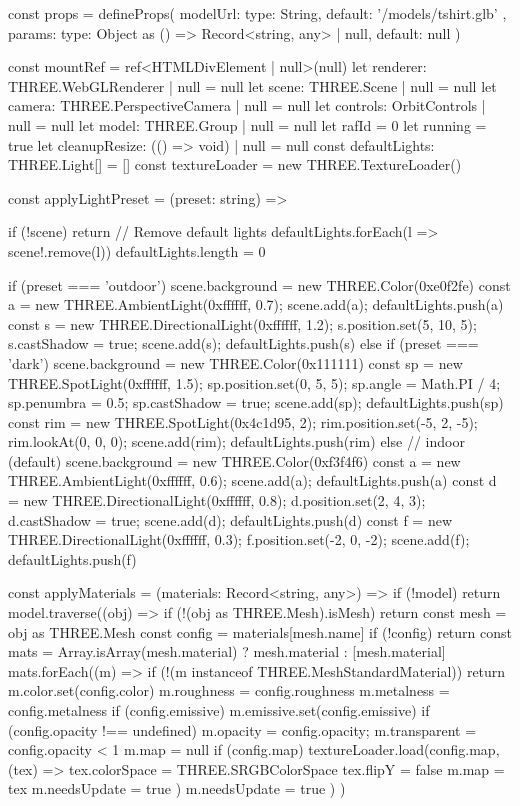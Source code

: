 \documentclass[twoside]{thesis-cls-Miya} %
\begin{document}
const props = defineProps({
  modelUrl: {
    type: String,
    default: '/models/tshirt.glb'
  },
  params: {
    type: Object as () => Record<string, any> | null,
    default: null
  }
})

const mountRef = ref<HTMLDivElement | null>(null)
let renderer: THREE.WebGLRenderer | null = null
let scene: THREE.Scene | null = null
let camera: THREE.PerspectiveCamera | null = null
let controls: OrbitControls | null = null
let model: THREE.Group | null = null
let rafId = 0
let running = true
let cleanupResize: (() => void) | null = null
const defaultLights: THREE.Light[] = []
const textureLoader = new THREE.TextureLoader()

const applyLightPreset = (preset: string) => {
  if (!scene) return
  // Remove default lights
  defaultLights.forEach(l => scene!.remove(l))
  defaultLights.length = 0

  if (preset === 'outdoor') {
    scene.background = new THREE.Color(0xe0f2fe)
    const a = new THREE.AmbientLight(0xffffff, 0.7); scene.add(a); defaultLights.push(a)
    const s = new THREE.DirectionalLight(0xffffff, 1.2); s.position.set(5, 10, 5); s.castShadow = true; scene.add(s); defaultLights.push(s)
  } else if (preset === 'dark') {
    scene.background = new THREE.Color(0x111111)
    const sp = new THREE.SpotLight(0xffffff, 1.5); sp.position.set(0, 5, 5); sp.angle = Math.PI / 4; sp.penumbra = 0.5; sp.castShadow = true; scene.add(sp); defaultLights.push(sp)
    const rim = new THREE.SpotLight(0x4c1d95, 2); rim.position.set(-5, 2, -5); rim.lookAt(0, 0, 0); scene.add(rim); defaultLights.push(rim)
  } else {
    // indoor (default)
    scene.background = new THREE.Color(0xf3f4f6)
    const a = new THREE.AmbientLight(0xffffff, 0.6); scene.add(a); defaultLights.push(a)
    const d = new THREE.DirectionalLight(0xffffff, 0.8); d.position.set(2, 4, 3); d.castShadow = true; scene.add(d); defaultLights.push(d)
    const f = new THREE.DirectionalLight(0xffffff, 0.3); f.position.set(-2, 0, -2); scene.add(f); defaultLights.push(f)
  }
}

const applyMaterials = (materials: Record<string, any>) => {
  if (!model) return
  model.traverse((obj) => {
    if (!(obj as THREE.Mesh).isMesh) return
    const mesh = obj as THREE.Mesh
    const config = materials[mesh.name]
    if (!config) return
    const mats = Array.isArray(mesh.material) ? mesh.material : [mesh.material]
    mats.forEach((m) => {
      if (!(m instanceof THREE.MeshStandardMaterial)) return
      m.color.set(config.color)
      m.roughness = config.roughness
      m.metalness = config.metalness
      if (config.emissive) m.emissive.set(config.emissive)
      if (config.opacity !== undefined) { m.opacity = config.opacity; m.transparent = config.opacity < 1 }
      m.map = null
      if (config.map) {
        textureLoader.load(config.map, (tex) => {
          tex.colorSpace = THREE.SRGBColorSpace
          tex.flipY = false
          m.map = tex
          m.needsUpdate = true
        })
      }
      m.needsUpdate = true
    })
  })
}
\end{document}
